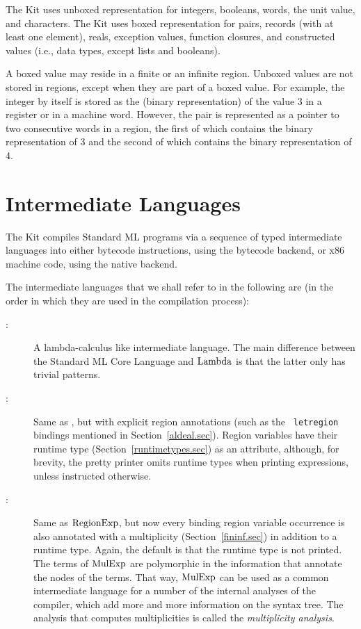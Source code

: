 \documentclass[12pt]{book}
\begin{document}
The Kit uses unboxed representation for integers, booleans, words, the
unit value, and characters.  The Kit uses boxed representation for
pairs, records (with at least one element), reals, exception values,
function closures, and constructed values (i.e., data types, except
lists and booleans).

A boxed value may reside in a finite or an infinite region.  Unboxed
values are not stored in regions, except when they are part of a boxed
value. For example, the integer  by itself is stored as the
(binary representation) of the value 3 in a register or in a machine
word. However, the pair  is represented as a pointer to
two consecutive words in a region, the first of which contains the
binary representation of 3 and the second of which contains the binary
representation of 4.

\section{Intermediate Languages}
The Kit compiles Standard ML programs via a sequence of typed
intermediate languages into either bytecode instructions, using the
bytecode backend, or x86 machine code, using the native backend.

The intermediate languages that we shall refer to in the following are
(in the order in which they are used in the compilation process):
\begin{description}
\item[\Lam:] 
  A lambda-calculus like intermediate language. The main difference
  between the Standard ML Core Language and $\hbox{\rm Lambda}$ is that the latter
  only has trivial patterns.
\item[\RegExp:] 
  Same as \Lam, but with explicit region annotations (such as the {\tt
    letregion} bindings mentioned in Section~\ref{aldeal.sec}). Region
  variables have their runtime type (Section~\ref{runtimetypes.sec})
  as an attribute, although, for brevity, the pretty printer omits
  runtime types when printing expressions, unless instructed
  otherwise.
\item[\MulExp:] 
  Same as $\hbox{\rm RegionExp}$, but now every binding region variable occurrence
  is also annotated with a multiplicity (Section~\ref{fininf.sec}) in
  addition to a runtime type.  Again, the default is that the runtime
  type is not printed.  The terms of $\hbox{\rm MulExp}$ are polymorphic in the
  information that annotate the nodes of the terms. That way,
  $\hbox{\rm MulExp}$ can be used as a common intermediate language for a number
  of the internal analyses of the compiler, which add more and more
  information on the syntax tree.  The analysis that computes
  multiplicities is called the
  {\em multiplicity analysis}.
\end{description}
\end{document}
